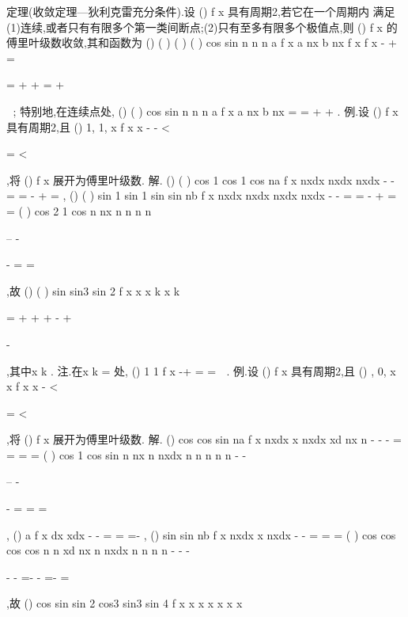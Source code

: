 \textcolor{lyred}{定理(收敛定理---狄利克雷充分条件)}.设
()
f x 具有周期2\pi ,若它在一个周期内 
满足(1)连续,或者只有有限多个第一类间断点;(2)只有至多有限多个极值点,则 
()
f x 的傅里叶级数收敛,其和函数为 
()
(
)
(
)
(
)
cos
sin
n
n
n
a
f x
a
nx
b
nx
f x
f x
\infty 
-
+
=


=
+
+
=
+


\sum 

; 
特别地,在连续点处,
()
(
)
cos
sin
n
n
n
a
f x
a
nx
b
nx
\infty 
=
=
+
+
\sum 
. 
\textcolor{lyred}{例}.设
()
f x 具有周期2\pi ,且
()
1,
1,
x
f x
x
\pi 
\pi 
-
-
\le 
<

=
\le 
<

,将
()
f x 展开为傅里叶级数. 
解.
()
(
)
cos
1 cos
1 cos
na
f x
nxdx
nxdx
nxdx
\pi 
\pi 
\pi 
\pi 
\pi 
\pi 
\pi 
-
-
=
=
-
+
\cdots 
=
\int 
\int 
\int 
, 
()
(
)
sin
1 sin
1 sin
sin
nb
f x
nxdx
nxdx
nxdx
nxdx
\pi 
\pi 
\pi 
\pi 
\pi 
\pi 
\pi 
\pi 
\pi 
-
-
=
=
-
+
\cdots 
=
=
\int 
\int 
\int 
\int 
(
)
cos
2 1 cos
n
nx
n
n
n
n
\pi 
\pi 
\pi 
\pi 
\pi 


--
-




-
=
\cdots 
=
\cdots 




,故 
()
(
)
sin
sin3
sin 2
f x
x
x
k
x
k
\pi 


=
+
+
+
-
+


-


\Lambda 
\Lambda ,其中x
k\pi 
\neq 
. 
\textcolor{lyred}{注}.在x
k\pi 
=
处,
()
1 1
f x
-+
=
=

. 
\textcolor{lyred}{例}.设
()
f x 具有周期2\pi ,且
()
,
0,
x
x
f x
x
\pi 
\pi 
-
\le 
<

=
\le 
<

,将
()
f x 展开为傅里叶级数. 
解.
()
cos
cos
sin
na
f x
nxdx
x
nxdx
xd
nx
n
\pi 
\pi 
\pi 
\pi 
\pi 
\pi 
\pi 
-
-
-
=
=
=
=
\int 
\int 
\int 
(
)
cos
1 cos
sin
n
nx
n
nxdx
n
n
n
n
n
\pi 
\pi 
\pi 
\pi 
\pi 
\pi 
\pi 
-
-


--
-


-
=
=
=








\int 
, 
()
a
f x dx
xdx
\pi 
\pi 
\pi 
\pi 
\pi 
\pi 
-
-
=
=
=-
\int 
\int 
,
()
sin
sin
nb
f x
nxdx
x
nxdx
\pi 
\pi 
\pi 
\pi 
\pi 
-
-
=
=
=
\int 
\int 
(
)
cos
cos
cos
cos
n
n
xd
nx
n
nxdx
n
n
n
n
\pi 
\pi 
\pi 
\pi 
\pi 
\pi 
\pi 
-
-
-


-
-
=-
-
=-
=




\int 
\int 
,故 
()
cos
sin
sin 2
cos3
sin3
sin 4
f x
x
x
x
x
x
x
\pi 
\pi 
\pi 




